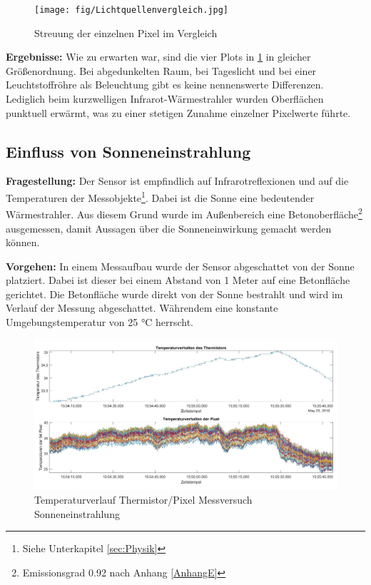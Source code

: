 \begin{figure}[H]
	\centering
	\texttt{[image: fig/Lichtquellenvergleich.jpg]}
	\caption[Streuung der einzelnen Pixel im Vergleich]{Streuung der einzelnen Pixel im Vergleich}
	\label{fig:Lichtquellen2}
\end{figure}

\textbf{Ergebnisse:}  Wie zu erwarten war, sind die vier Plots in \ref{fig:Lichtquellen2} in gleicher Größenordnung. Bei abgedunkelten Raum, bei Tageslicht und bei einer Leuchtstoffröhre als Beleuchtung gibt es keine nennenswerte Differenzen. Lediglich beim kurzwelligen Infrarot-Wärmestrahler wurden Oberflächen punktuell erwärmt, was zu einer stetigen Zunahme einzelner Pixelwerte führte. 
\newpage
\subsection{Einfluss von  Sonneneinstrahlung}

\textbf{Fragestellung:} Der Sensor ist empfindlich auf Infrarotreflexionen und auf die Temperaturen der Messobjekte\footnote[19]{Siehe Unterkapitel  \ref{sec:Physik}}. Dabei ist die Sonne eine bedeutender Wärmestrahler. Aus diesem Grund wurde im Außenbereich eine Betonoberfläche\footnote[20]{Emissionsgrad 0.92 nach Anhang \ref{AnhangE}} ausgemessen, damit Aussagen über die Sonneneinwirkung gemacht werden können. 

\textbf{Vorgehen:} In einem Messaufbau wurde der Sensor abgeschattet von der Sonne platziert. Dabei ist dieser bei einem Abstand von 1 Meter auf eine Betonfläche gerichtet. Die Betonfläche wurde direkt von der Sonne bestrahlt und wird im Verlauf der Messung abgeschattet. Währendem eine konstante Umgebungstemperatur von 25 °C herrscht.  


\begin{figure}[H]
	\centering
	\includegraphics[width=1.0\textwidth]{fig/Temperaturverhalten2}
	\caption[Temperaturverlauf Thermistor/Pixel Messversuch Sonneneinstrahlung]{Temperaturverlauf Thermistor/Pixel Messversuch Sonneneinstrahlung}
	\label{fig:temperaturverhalten2}
\end{figure}

